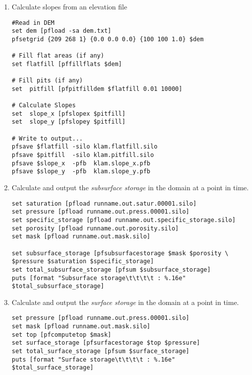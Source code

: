 \begin{enumerate}
\item Calculate slopes from an elevation file
\begin{display}\begin{verbatim}
#Read in DEM
set dem [pfload -sa dem.txt]
pfsetgrid {209 268 1} {0.0 0.0 0.0} {100 100 1.0} $dem

# Fill flat areas (if any)
set flatfill [pffillflats $dem]

# Fill pits (if any)
set  pitfill [pfpitfilldem $flatfill 0.01 10000]

# Calculate Slopes
set  slope_x [pfslopex $pitfill]
set  slope_y [pfslopey $pitfill]

# Write to output...
pfsave $flatfill -silo klam.flatfill.silo
pfsave $pitfill  -silo klam.pitfill.silo
pfsave $slope_x  -pfb  klam.slope_x.pfb
pfsave $slope_y  -pfb  klam.slope_y.pfb
\end{verbatim}\end{display}

\item Calculate and output the \emph{subsurface storage} in the domain at a point in time.
\begin{display}\begin{verbatim}
set saturation [pfload runname.out.satur.00001.silo]
set pressure [pfload runname.out.press.00001.silo]
set specific_storage [pfload runname.out.specific_storage.silo]
set porosity [pfload runname.out.porosity.silo]
set mask [pfload runname.out.mask.silo]

set subsurface_storage [pfsubsurfacestorage $mask $porosity \
$pressure $saturation $specific_storage]
set total_subsurface_storage [pfsum $subsurface_storage]
puts [format "Subsurface storage\t\t\t\t : %.16e" $total_subsurface_storage]
\end{verbatim}\end{display}

\item Calculate and output the \emph{surface storage} in the domain at a point in time.
\begin{display}\begin{verbatim}
set pressure [pfload runname.out.press.00001.silo]
set mask [pfload runname.out.mask.silo]
set top [pfcomputetop $mask]
set surface_storage [pfsurfacestorage $top $pressure]
set total_surface_storage [pfsum $surface_storage]
puts [format "Surface storage\t\t\t\t : %.16e" $total_surface_storage]
\end{verbatim}\end{display}


\end{enumerate}
